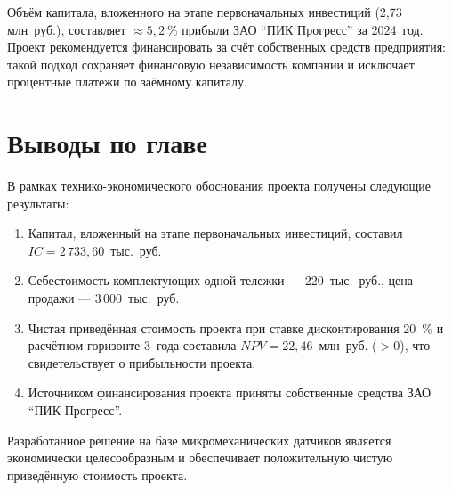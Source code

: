Объём капитала, вложенного на этапе первоначальных инвестиций (2,73 млн~руб.), составляет ${\approx}5{,}2~\%$ прибыли ЗАО \enquote{ПИК Прогресс} за 2024~год. Проект рекомендуется финансировать за счёт собственных средств предприятия: такой подход сохраняет финансовую независимость компании и исключает процентные платежи по заёмному капиталу.


\section*{Выводы по главе}

В рамках технико-экономического обоснования проекта получены следующие результаты:

\begin{enumerate}
	\item Капитал, вложенный на этапе первоначальных инвестиций, составил $IC = 2\,733{,}60$~тыс.~руб.
	
	\item Себестоимость комплектующих одной тележки --- 220~тыс.~руб., цена продажи --- 3\,000~тыс.~руб.
	
	\item Чистая приведённая стоимость проекта при ставке дисконтирования 20~\% и расчётном горизонте 3~года составила $NPV = 22{,}46$~млн~руб. (${>}0$), что свидетельствует о прибыльности проекта.
	
	\item Источником финансирования проекта приняты собственные средства ЗАО \enquote{ПИК Прогресс}.
\end{enumerate}

Разработанное решение на базе микромеханических датчиков является экономически целесообразным и обеспечивает положительную чистую приведённую стоимость проекта.

